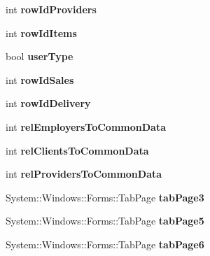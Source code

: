 \begin{DoxyCompactItemize}
int {\bfseries row\+Id\+Providers}
\item 
\hypertarget{class_magazyn_1_1_magazin_adee85654266cc917756f546dc7801745}{}\label{class_magazyn_1_1_magazin_adee85654266cc917756f546dc7801745} 
int {\bfseries row\+Id\+Items}
\item 
\hypertarget{class_magazyn_1_1_magazin_a3943355da36015389e078e7f9e989adc}{}\label{class_magazyn_1_1_magazin_a3943355da36015389e078e7f9e989adc} 
bool {\bfseries user\+Type}
\item 
\hypertarget{class_magazyn_1_1_magazin_a3040c9806b07453e84d1de92bd1d0bc3}{}\label{class_magazyn_1_1_magazin_a3040c9806b07453e84d1de92bd1d0bc3} 
int {\bfseries row\+Id\+Sales}
\item 
\hypertarget{class_magazyn_1_1_magazin_aed86ec103ad7d5a3fadfe6747c43c67a}{}\label{class_magazyn_1_1_magazin_aed86ec103ad7d5a3fadfe6747c43c67a} 
int {\bfseries row\+Id\+Delivery}
\item 
\hypertarget{class_magazyn_1_1_magazin_a2eff03de469b7bee4d22c1d19177b1f5}{}\label{class_magazyn_1_1_magazin_a2eff03de469b7bee4d22c1d19177b1f5} 
int {\bfseries rel\+Employers\+To\+Common\+Data}
\item 
\hypertarget{class_magazyn_1_1_magazin_aca20842544e847897b0486c23367deac}{}\label{class_magazyn_1_1_magazin_aca20842544e847897b0486c23367deac} 
int {\bfseries rel\+Clients\+To\+Common\+Data}
\item 
\hypertarget{class_magazyn_1_1_magazin_ac0af9c6064fdfc6851dbf3a38e79c9f9}{}\label{class_magazyn_1_1_magazin_ac0af9c6064fdfc6851dbf3a38e79c9f9} 
int {\bfseries rel\+Providers\+To\+Common\+Data}
\item 
\hypertarget{class_magazyn_1_1_magazin_a7d8fe5a75b5d8b475482bbde6844c19a}{}\label{class_magazyn_1_1_magazin_a7d8fe5a75b5d8b475482bbde6844c19a} 
System\+::\+Windows\+::\+Forms\+::\+Tab\+Page {\bfseries tab\+Page3}
\item 
\hypertarget{class_magazyn_1_1_magazin_a8277625094bb9ae5a653c825b93dc748}{}\label{class_magazyn_1_1_magazin_a8277625094bb9ae5a653c825b93dc748} 
System\+::\+Windows\+::\+Forms\+::\+Tab\+Page {\bfseries tab\+Page5}
\item 
\hypertarget{class_magazyn_1_1_magazin_a696e9865991756db41efa21aca8db442}{}\label{class_magazyn_1_1_magazin_a696e9865991756db41efa21aca8db442} 
System\+::\+Windows\+::\+Forms\+::\+Tab\+Page {\bfseries tab\+Page6}
\item 
\hypertarget{class_magazyn_1_1_magazin_ac72e11b840969ffad509502c88e22a0b}{}\label{class_magazyn_1_1_magazin_ac72e11b840969ffad509502c88e22a0b} 

\end{DoxyCompactItemize}
